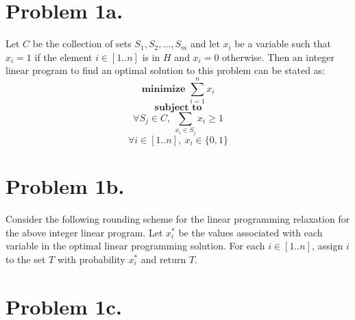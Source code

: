 \documentclass[12pt]{article}
\begin{document}
\pagestyle{plain}
\titleformat{\subsection}[runin]
  {\normalfont\large\bfseries}{\thesubsection}{1em}{}
\titleformat{\subsubsection}[runin]
  {\normalfont\large\bfseries}{\thesubsubsection}{1em}{}

\section*{Problem 1a.}
Let $C$ be the collection of sets $S_1, S_2, ...,S_m$ and let $x_i$ be a
variable such that $x_i = 1$ if the element $i \in [1..n]$ is in $H$ and
$x_i = 0$ otherwise. Then an integer linear program to find an optimal solution
to this problem can be stated as:
$$ \textbf{minimize } \sum_{i=1}^n x_i $$
$$ \textbf{ subject to } $$
$$ \forall S_j \in C,\ \sum_{x_i \in S_j} x_i \ge 1 $$
$$ \forall i \in [1..n],\ x_i \in \{0,1\} $$

\section*{Problem 1b.}
Consider the following rounding scheme for the linear programming relaxation for
the above integer linear program. Let $x^*_i$ be the values associated with each
variable in the optimal linear programming solution. For each $i \in [1..n]$,
assign $i$ to the set $T$ with probability $x^*_i$ and return $T$.

\section*{Problem 1c.}
\end{document}
